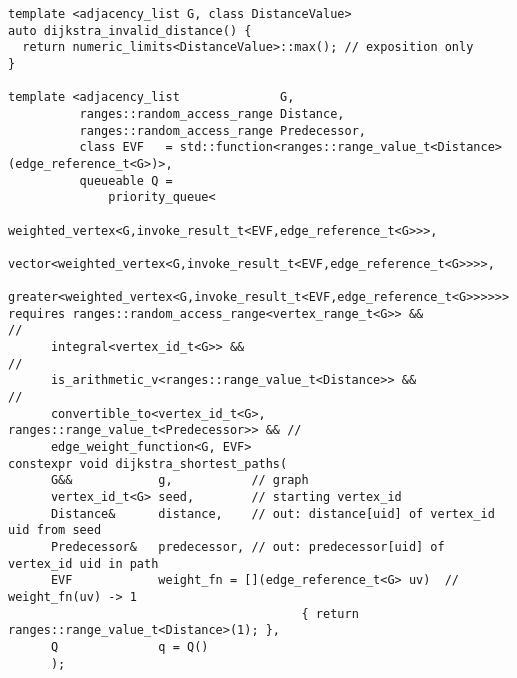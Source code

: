 \documentclass[10pt,onecolumn]{article}
\begin{document}
\begin{lstlisting}
template <adjacency_list G, class DistanceValue>
auto dijkstra_invalid_distance() {
  return numeric_limits<DistanceValue>::max(); // exposition only
}

template <adjacency_list              G,
          ranges::random_access_range Distance,
          ranges::random_access_range Predecessor,
          class EVF   = std::function<ranges::range_value_t<Distance>(edge_reference_t<G>)>,
          queueable Q = 
              priority_queue<
                  weighted_vertex<G,invoke_result_t<EVF,edge_reference_t<G>>>,
                  vector<weighted_vertex<G,invoke_result_t<EVF,edge_reference_t<G>>>>,
                  greater<weighted_vertex<G,invoke_result_t<EVF,edge_reference_t<G>>>>>>
requires ranges::random_access_range<vertex_range_t<G>> &&                  //
      integral<vertex_id_t<G>> &&                                           //
      is_arithmetic_v<ranges::range_value_t<Distance>> &&                   //
      convertible_to<vertex_id_t<G>, ranges::range_value_t<Predecessor>> && //
      edge_weight_function<G, EVF>
constexpr void dijkstra_shortest_paths(
      G&&            g,           // graph
      vertex_id_t<G> seed,        // starting vertex_id
      Distance&      distance,    // out: distance[uid] of vertex_id uid from seed
      Predecessor&   predecessor, // out: predecessor[uid] of vertex_id uid in path
      EVF            weight_fn = [](edge_reference_t<G> uv)  // weight_fn(uv) -> 1
                                         { return ranges::range_value_t<Distance>(1); },
      Q              q = Q()
      );
\end{lstlisting}
\end{document}
